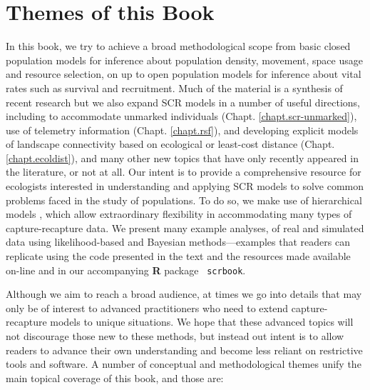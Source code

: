 \section*{Themes of this Book}

In this book, we try to achieve a broad methodological scope from
basic closed population models for inference about population density,
movement, space usage and resource selection, on up to open population
models for inference about vital rates such as survival and
recruitment.  Much of the material is a synthesis of recent research
but we also expand SCR models in a number of useful directions,
including to accommodate unmarked individuals
(Chapt. \ref{chapt.scr-unmarked}), use of telemetry information
(Chapt. \ref{chapt.rsf}), and developing explicit models of landscape
connectivity based on ecological or least-cost distance
(Chapt. \ref{chapt.ecoldist}), and many other new topics that have
only recently appeared in the literature, or not at all.  Our intent
is to provide a comprehensive resource for ecologists interested in
understanding and applying SCR models to solve common problems faced
in the study of populations.  To do so, we make use of hierarchical
models \citep{royle_dorazio:2008}, which allow extraordinary
flexibility in accommodating many types of capture-recapture data. We
present many example analyses, of real and simulated data using
likelihood-based and Bayesian methods---examples that readers can
replicate using the code presented in the text and the resources made
available on-line and in our accompanying {\bf R} package {\tt
  scrbook}.

Although we aim to reach a broad audience, at times we go into details
that may only be of interest to advanced practitioners who need to
extend capture-recapture models to unique situations.  We hope that
these advanced topics will not discourage those new to these methods,
but instead out intent is to allow readers to advance their own
understanding and become less reliant on restrictive tools and
software.  A number of conceptual and methodological themes unify the
main topical coverage of this book, and those are:

